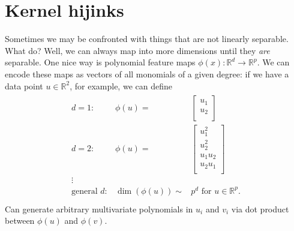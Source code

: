 \documentclass[11pt,letterpaper]{article}
\theoremstyle{definition}
\numberwithin{equation}{section}
\numberwithin{figure}{section}
\begin{document}
\section{Kernel hijinks}
Sometimes we may be confronted with things that are not linearly separable. What do? Well, we can always map into more dimensions until they \emph{are} separable. One nice way is polynomial feature maps $\phi(x) : \mathbb{R}^d \to \mathbb{R}^p$. We can encode these maps as vectors of all monomials of a given degree: if we have a data point $u \in \mathbb{R}^2$, for example, we can define
%
\begin{align}
	\begin{array}{lrr}
	d = 1:& \phi(u) =& \begin{bmatrix}u_1\\u_2\\\end{bmatrix}\\
	d = 2:& \phi(u) =& \begin{bmatrix}u_1^2\\u_2^2\\u_1u_2\\u_2u_1\\\end{bmatrix}\\
	\vdots &&\\
	\text{general }d :& \dim(\phi(u)) \sim& p^d \text{ for } u\in \mathbb{R}^p.\\
	\end{array}
\end{align}
%
Can generate arbitrary multivariate polynomials in $u_i$ and $v_i$ via dot product between $\phi(u)$ and $\phi(v)$.
\end{document}
